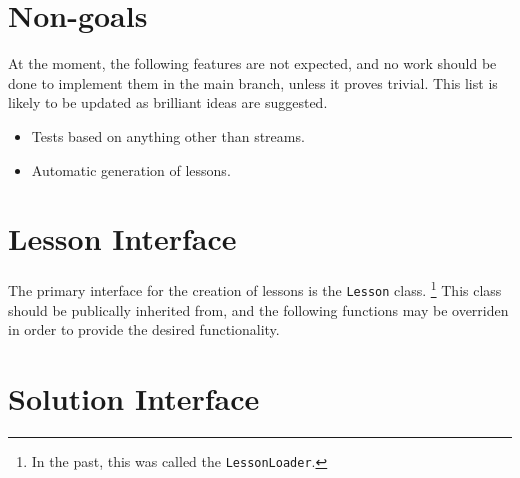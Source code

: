 \documentclass[12pt,a4paper]{report}
\begin{document}
	\chapter{Non-goals}
		At the moment, the following features are not expected, and no work
		should be done to implement them in the main branch, unless it proves
		trivial.  This list is likely to be updated as brilliant ideas are suggested.
		\begin{itemize}
			\item Tests based on anything other than streams.
			\item Automatic generation of lessons.
		\end{itemize}

	\chapter{Lesson Interface}
		The primary interface for the creation of lessons is the \texttt{Lesson} class.
		\footnote{In the past, this was called the \texttt{LessonLoader}.} This class
		should be publically inherited from, and the following functions may be
		overriden in order to provide the desired functionality.
	\chapter{Solution Interface}
\end{document}

